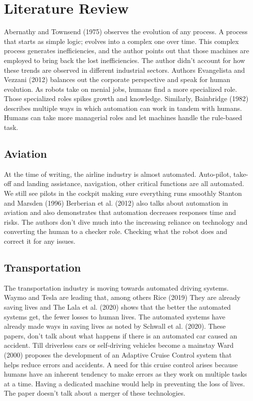 \documentclass[
  man]{apa7}
\begin{document}
\hypertarget{literature-review}{%
\section{Literature Review}\label{literature-review}}

Abernathy and Townsend (1975) observes the evolution of any process. A process that starts as simple logic; evolves into a complex one over time. This complex process generates inefficiencies, and the author points out that those machines are employed to bring back the lost inefficiencies. The author didn't account for how these trends are observed in different industrial sectors. Authors Evangelista and Vezzani (2012) balances out the corporate perspective and speak for human evolution. As robots take on menial jobs, humans find a more specialized role. Those specialized roles spikes growth and knowledge. Similarly, Bainbridge (1982) describes multiple ways in which automation can work in tandem with humans. Humans can take more managerial roles and let machines handle the rule-based task.

\hypertarget{aviation}{%
\subsection{Aviation}\label{aviation}}

At the time of writing, the airline industry is almost automated. Auto-pilot, take-off and landing assistance, navigation, other critical functions are all automated. We still see pilots in the cockpit making sure everything runs smoothly Stanton and Marsden (1996) Berberian et al. (2012) also talks about automation in aviation and also demonstrates that automation decreases responses time and risks. The authors don't dive much into the increasing reliance on technology and converting the human to a checker role. Checking what the robot does and correct it for any issues.

\hypertarget{transportation}{%
\subsection{Transportation}\label{transportation}}

The transportation industry is moving towards automated driving systems. Waymo and Tesla are leading that, among others Rice (2019) They are already saving lives and The Lala et al. (2020) shows that the better the automated systems get, the fewer losses to human lives. The automated systems have already made ways in saving lives as noted by Schwall et al. (2020). These papers, don't talk about what happens if there is an automated car caused an accident. Till driverless cars or self-driving vehicles become a mainstay Ward (2000) proposes the development of an Adaptive Cruise Control system that helps reduce errors and accidents. A need for this cruise control arises because humans have an inherent tendency to make errors as they work on multiple tasks at a time. Having a dedicated machine would help in preventing the loss of lives. The paper doesn't talk about a merger of these technologies.
\end{document}
